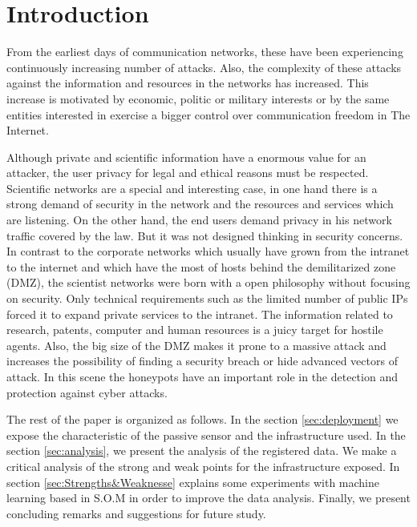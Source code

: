 \documentclass[a4paper]{llncs}
\begin{document}
	
\section{Introduction}
From the earliest days of communication networks, these have been experiencing continuously increasing number of attacks\cite{esset-tendencias,cni-ccn-tendencias-2014,cni-ccn-tendencias-2015}. Also, the complexity of these attacks against the information and resources in the networks has increased. This increase is motivated by  economic, politic or military interests or by the same entities interested in exercise a bigger control over communication freedom in The Internet\cite{cni-ccn-tendencias-2015,cisco-2014}.
	
Although private and scientific information have a enormous value for an attacker, the user privacy for legal and ethical reasons must be respected. Scientific networks are a special and interesting case, in one hand there is a strong demand of security in the network and the resources and services which are listening. On the other hand, the end users demand privacy in his network traffic covered by the law. But it was not designed thinking in security concerns\cite{iris-proyecto}. In contrast to the corporate networks which usually have grown from the intranet to the internet and which have the most of hosts behind the demilitarized zone (DMZ), the scientist networks were born with a open philosophy without focusing on security\cite{iris-proyecto}. Only technical requirements such as the limited number of public IPs forced it to expand private services to the intranet. The information related to research, patents, computer and human resources is a juicy target for hostile agents. Also, the big size of the DMZ makes it prone to a massive attack and increases the possibility of finding a security breach or hide advanced vectors of attack. In this scene the honeypots have an important role in the detection and protection against cyber attacks.

The rest of the paper is organized as follows. In the section \ref{sec:deployment} we expose the characteristic of the passive sensor and the infrastructure used. In the section \ref{sec:analysis}, we present the analysis of the registered data. We make a critical analysis of the strong and weak points for the infrastructure exposed. In section \ref{sec:Strengths&Weaknesse} explains some experiments with machine learning based in S.O.M in order to improve the data analysis. Finally, we present concluding remarks and suggestions for future study.
\end{document}
